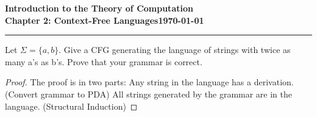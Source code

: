 \documentclass[11pt]{article}
\newcommand{\dated}{\today}
\begin{document}
\textbf{Introduction to the Theory of
Computation}\hfill\textbf{\myname}\\[0.01in]
\textbf{Chapter 2: Context-Free Languages}\hfill\textbf{\dated}\\
\smallskip\hrule\bigskip

\begin{problem}{2.21}
Let $\Sigma = \{a,b\}$. Give a CFG generating the language of strings with twice as many a’s as b’s. Prove that your grammar is correct.
\end{problem}

\begin{idea}
\end{idea}

\begin{proof}
The proof is in two parts:
Any string in the language has a derivation. (Convert grammar to PDA)
All strings generated by the grammar are in the language. (Structural Induction)
\end{proof}
\end{document}
